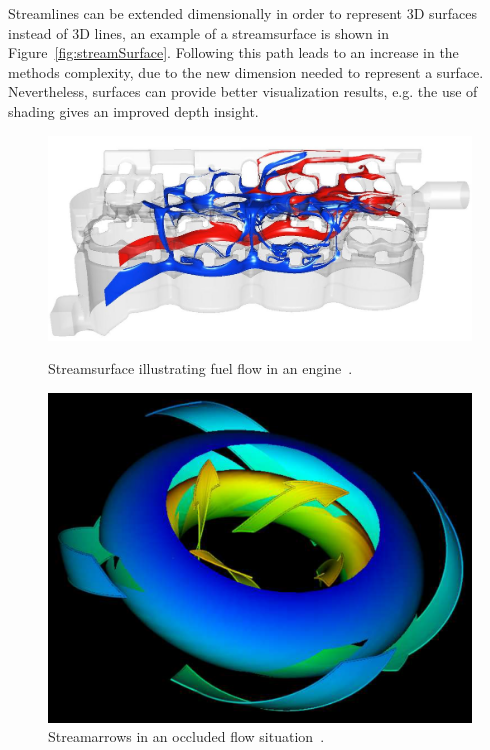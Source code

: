 Streamlines can be extended dimensionally in order to represent 3D surfaces instead of 3D lines, an example of a streamsurface is shown in Figure~\ref{fig:streamSurface}.
Following this path leads to an increase in the methods complexity, due to the new dimension needed to represent a surface.
Nevertheless, surfaces can provide better visualization results, e.g. the use of shading gives an improved depth insight.

\begin{figure}[htbp]
	\centering
	\begin{minipage}[t]{.45\textwidth}
		\centering
		\includegraphics[width=1.05\textwidth]{images/streamSurface}
		\caption{Streamsurface illustrating fuel flow in an engine~\cite{Laramee2005a}.}
		\label{fig:streamSurface}
	\end{minipage}\qquad
	\begin{minipage}[t]{.45\textwidth}
		\centering
		\includegraphics[width=.8\textwidth]{images/streamArrows2}
		\caption{Streamarrows in an occluded flow situation~\cite{Loffelmann1997}.}
		\label{fig:streamArrows2}
	\end{minipage}
\end{figure}

